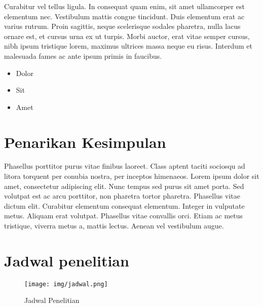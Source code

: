 Curabitur vel tellus ligula. In consequat quam enim, sit amet
ullamcorper est elementum nec. Vestibulum mattis congue
tincidunt. Duis elementum erat ac varius rutrum. Proin sagittis, neque
scelerisque sodales pharetra, nulla lacus ornare est, et cursus urna
ex ut turpis. Morbi auctor, erat vitae semper cursus, nibh ipsum
tristique lorem, maximus ultrices massa neque eu risus. Interdum et
malesuada fames ac ante ipsum primis in faucibus.

\begin{itemize}
\item Dolor
\item Sit
\item Amet
\end{itemize}


\section{Penarikan Kesimpulan}
\label{subsec:label}

Phasellus porttitor purus \textcite{warn} vitae finibus laoreet. Class
aptent taciti sociosqu ad litora torquent per conubia nostra, per
inceptos himenaeos. Lorem ipsum dolor sit amet, consectetur adipiscing
elit. Nunc tempus sed purus sit amet porta. Sed volutpat est ac arcu
porttitor, non pharetra tortor pharetra. Phasellus vitae dictum
elit. Curabitur elementum consequat elementum. Integer in vulputate
metus. Aliquam erat volutpat. Phasellus vitae convallis orci. Etiam ac
metus tristique, viverra metus a, mattis lectus. Aenean vel vestibulum
augue.

\section{Jadwal penelitian}
\label{subsec:label}

\begin{figure}[tph]
  \centering
  \texttt{[image: img/jadwal.png]}
  \caption{Jadwal Penelitian}
  \label{fig:jadwal-penelitian}
\end{figure}
